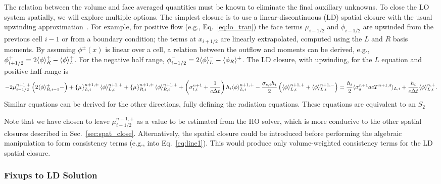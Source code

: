 The relation between the volume and face averaged quantities must be known to eliminate
the final auxillary unknowns.
To close the LO system spatially, we will explore multiple options.  The simplest closure
is to use a linear-discontinuous (LD) spatial closure with the usual upwinding
approximation~\cite{morel_ldtrt}.  For example, for positive flow (e.g., Eq.~\eqref{eq:lo_tran}) the face terms $\mu_{i-1/2}$ and $\phi_{i-1/2}$
are upwinded from the previous cell $i-1$ or from a boundary condition; the terms
at $x_{i+1/2}$ are linearly extrapolated, computed using the $L$ and $R$ basis
moments.  By assuming $\phi^\pm(x)$ is linear over a cell, a relation between the 
outflow and moments can be derived, e.g., $\phi^+_{i+1/2} = 2\langle \phi \rangle_R^+ -
\langle \phi \rangle_L^+$. For the negative half range, $\phi^-_{i-1/2} = 2\langle \phi \rangle_L^- -
\langle \phi_R \rangle^+$.  The LD closure, with upwinding, for the $L$ equation and positive half-range is
\begin{equation}
    -2{\mu}_{i-1/2}^{n+1,+} \left(2\langle \phi \rangle_{R,i-1}^+ -         \right) + \left\{ \mu \right\}_{L,i}^{n+1,+}
  \langle \phi \rangle_{L,i}^{n+1,+}
  +  \left\{ \mu \right\}_{R,i}^{n+1,+}
  \langle \phi \rangle_{R,i}^{n+1,+} +  \left(\sigma_{t,i}^{n+1}+\frac{1}{c \Delta t} \right) h_i 
  \langle \phi \rangle_{L,i}^{n+1,+} \\-  \frac{\sigma_{s,i} h_i}{2} \left( \langle \phi \rangle_{L,i}^{n+1,+} +
  \langle \phi \rangle_{L,i}^{n+1,-}\right) = \frac{h_i}{2} \langle \sigma_a^{n+1} a c T^{n+1,4} \rangle_{L,i} +
  \frac{h_i}{c\Delta t}\langle \phi \rangle_{L,i}^{n,+}.
\end{equation}
Similar equations can be derived for the other directions, fully defining the radiation
equations. These equations are equivalent to an $S_2$

Note that we have chosen to leave $\mu_{i-1/2}^{n+1,+}$ as a value to be estimated from the HO solver,
which is more conducive to the other spatial closures described in
Sec.~\ref{sec:spat_close}.
Alternatively, the spatial closure could be introduced before performing the algebraic
manipulation to form consistency terms (e.g., into Eq.~\eqref{eq:line1}).  This would produce only volume-weighted consistency
terms for the LD spatial closure.


\subsubsection{Fixups to LD Solution}

